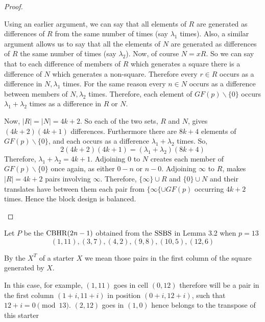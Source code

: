\begin{proof}
\begin{enumerate}
{    Using an earlier argument, we can say that
    all elements of $R$ are generated as differences of $R$
    from the same number of times (say $\lambda _1$ times).
    Also, a similar argument allows us to say that all the
    elements of $N$ are generated as differences of $R$ the
    same number of times (say $\lambda _2$). Now, of course
    $N = xR$. So we can say that to each difference of
    members of $R$ which generates a square there is a
    difference of $N$ which generates a non-square.
    Therefore every $r \in R$ occurs as a difference in
    $N, \lambda _1$ times. For the same reason every
    $n \in N$ occurs as a difference between members of
    $N, \lambda _2$ times. Therefore, each element of
    $GF(p) \backslash \{0\}$ occurs $\lambda _1 + \lambda _2$
    times as a difference in $R$ or $N$.
    
    Now, $|R| = |N| = 4k + 2$. So each of the two sets, $R$
    and $N$, gives $(4k + 2)(4k + 1)$ differences. Furthermore
    there are $8k + 4$ elements of $GF(p) \backslash \{0\}$,
    and each occurs as a difference
    $\lambda _1 + \lambda _2$ times. So,
    \begin{equation}
    2(4k + 2)(4k + 1) = (\lambda _1 + \lambda _2)(8k + 4)
    \end{equation}
    Therefore, $\lambda _1 + \lambda _2 = 4k + 1$.
    Adjoining 0 to $N$ creates each member of
    $GF(p) \backslash \{0\}$ once again, as either $0-n$ or
    $n-0$.
    Adjoining $\infty$ to $R$, makes $|R| = 4k + 2$ pairs
    involving $\infty$. Therefore, $\{\infty\} \cup R$ and
    $\{0\} \cup N$ and their translates have between them
    each pair from $\{\infty\{ \cup GF(p)$ occurring $4k + 2$
    times. Hence the block design is balanced.}
\end{enumerate}
\end{proof}

\begin{example}
Let $P$ be the $\operatorname{CBHR}(2n - 1)$ obtained from the $\operatorname{SSBS}$ in Lemma 3.2 when $p = 13$
\begin{equation}
  (1, 11), (3, 7), (4, 2), (9, 8), (10, 5), (12, 6)
\end{equation}
\end{example}

By the  $X^T$ of a starter $X$ we mean those pairs in the first column of the square generated by $X$.

In this case, for example, $(1, 11)$ goes in cell $(0, 12)$ therefore will be a pair in the first column $(1 + i, 11 + i)$ in position $(0 + i, 12 + i)$, such that $12 + i = 0\pmod{13}$. $(2, 12)$ goes in $(1, 0)$ hence belongs to the transpose of this starter

